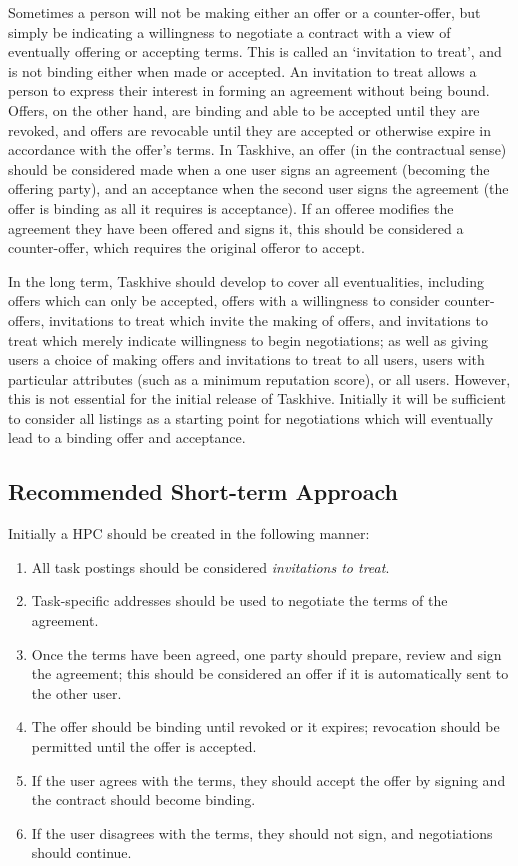 \documentclass[a4paper,12pt]{article}
\begin{document}
Sometimes a person will not be making either an offer or a counter-offer, but simply be indicating a willingness to negotiate a contract with a view of eventually offering or accepting terms. This is called an `invitation to treat', and is not binding either when made or accepted. An invitation to treat allows a person to express their interest in forming an agreement without being bound. Offers, on the other hand, are binding and able to be accepted until they are revoked, and offers are revocable until they are accepted or otherwise expire in accordance with the offer's terms. In Taskhive, an offer (in the contractual sense) should be considered made when a one user signs an agreement (becoming the offering party), and an acceptance when the second user signs the agreement (the offer is binding as all it requires is acceptance). If an offeree modifies the agreement they have been offered and signs it, this should be considered a counter-offer, which requires the original offeror to accept.

In the long term, Taskhive should develop to cover all eventualities, including offers which can only be accepted, offers with a willingness to consider counter-offers, invitations to treat which invite the making of offers, and invitations to treat which merely indicate willingness to begin negotiations; as well as giving users a choice of making offers and invitations to treat to all users, users with particular attributes (such as a minimum reputation score), or all users. However, this is not essential for the initial release of Taskhive. Initially it will be sufficient to consider all listings as a starting point for negotiations which will eventually lead to a binding offer and acceptance.

\subsection{Recommended Short-term Approach}

Initially a HPC should be created in the following manner:

\begin{enumerate}
	\item All task postings should be considered \textit{invitations to treat}.
	\item Task-specific addresses should be used to negotiate the terms of the agreement.
	\item Once the terms have been agreed, one party should prepare, review and sign the agreement; this should be considered an offer if it is automatically sent to the other user.
	\item The offer should be binding until revoked or it expires; revocation should be permitted until the offer is accepted.
	\item If the user agrees with the terms, they should accept the offer by signing and the contract should become binding.
	\item If the user disagrees with the terms, they should not sign, and negotiations should continue.
\end{enumerate}
\end{document}
